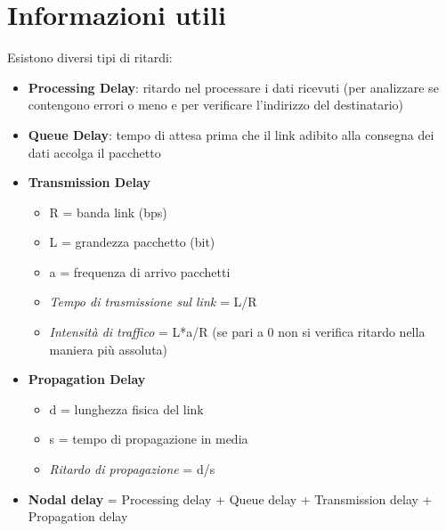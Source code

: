 \section{Informazioni utili}
Esistono diversi tipi di ritardi:
\begin{itemize}
	\item \textbf{Processing Delay}: ritardo nel processare i dati ricevuti (per analizzare se contengono errori o meno e per verificare l'indirizzo del destinatario)
	\item \textbf{Queue Delay}: tempo di attesa prima che il link adibito alla consegna dei dati accolga il pacchetto
	\item \textbf{Transmission Delay}
	\begin{itemize}
		\item R = banda link (bps)
		\item L = grandezza pacchetto (bit)
		\item a = frequenza di arrivo pacchetti
		\item \textit{Tempo di trasmissione sul link} = L/R
		\item \textit{Intensità di traffico} = L*a/R (se pari a 0 non si verifica ritardo nella maniera più assoluta)
	\end{itemize}
	\item \textbf{Propagation Delay}
	\begin{itemize}
		\item d = lunghezza fisica del link
		\item s = tempo di propagazione in media
		\item \textit{Ritardo di propagazione} = d/s
	\end{itemize}
	\item \textbf{Nodal delay} = Processing delay + Queue delay + Transmission delay + Propagation delay
\end{itemize}